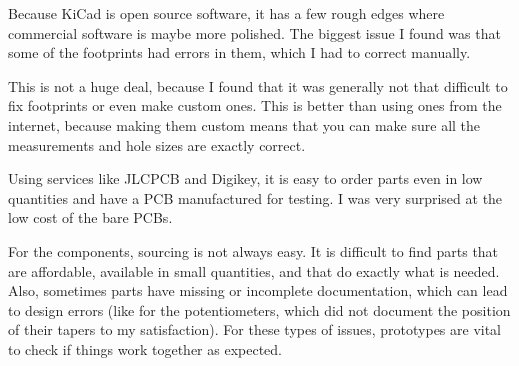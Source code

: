 \documentclass[a4paper]{article}
\begin{document}
Because KiCad is open source software, it has a few rough edges where commercial software is maybe more polished. The biggest issue I found was that some of the footprints had errors in them, which I had to correct manually. 

This is not a huge deal, because I found that it was generally not that difficult to fix footprints or even make custom ones. This is better than using ones from the internet, because making them custom means that you can make sure all the measurements and hole sizes are exactly correct.

Using services like JLCPCB and Digikey, it is easy to order parts even in low quantities and have a PCB manufactured for testing. I was very surprised at the low cost of the bare PCBs.

For the components, sourcing is not always easy. It is difficult to find parts that are affordable, available in small quantities, and that do exactly what is needed. Also, sometimes parts have missing or incomplete documentation, which can lead to design errors (like for the potentiometers, which did not document the position of their tapers to my satisfaction). For these types of issues, prototypes are vital to check if things work together as expected.
\end{document}
